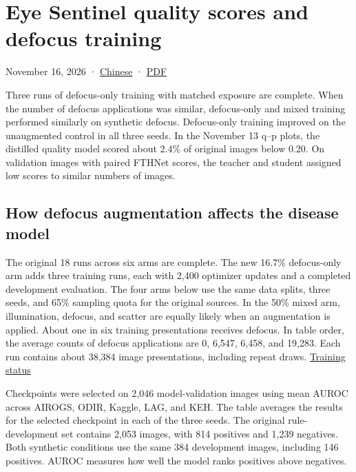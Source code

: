 \documentclass[
  10pt,
]{article}
\author{}
\date{}
\begin{document}
\section{Eye Sentinel quality scores and defocus
training}\label{eye-sentinel-quality-scores-and-defocus-training}

November 16, 2026 · \href{quality-alignment.zh.md}{Chinese} ·
\href{quality-alignment.en.pdf}{PDF}

Three runs of defocus-only training with matched exposure are complete.
When the number of defocus applications was similar, defocus-only and
mixed training performed similarly on synthetic defocus. Defocus-only
training improved on the unaugmented control in all three seeds. In the
November 13 q--p plots, the distilled quality model scored about 2.4\%
of original images below 0.20. On validation images with paired FTHNet
scores, the teacher and student assigned low scores to similar numbers
of images.

\subsection{How defocus augmentation affects the disease
model}\label{how-defocus-augmentation-affects-the-disease-model}

The original 18 runs across six arms are complete. The new 16.7\%
defocus-only arm adds three training runs, each with 2,400 optimizer
updates and a completed development evaluation. The four arms below use
the same data splits, three seeds, and 65\% sampling quota for the
original sources. In the 50\% mixed arm, illumination, defocus, and
scatter are equally likely when an augmentation is applied. About one in
six training presentations receives defocus. In table order, the average
counts of defocus applications are 0, 6,547, 6,458, and 19,283. Each run
contains about 38,384 image presentations, including repeat draws.
\href{../../../runs/followup_20261115/matched_defocus/status.json}{Training
status}

Checkpoints were selected on 2,046 model-validation images using mean
AUROC across AIROGS, ODIR, Kaggle, LAG, and KEH. The table averages the
results for the selected checkpoint in each of the three seeds. The
original rule-development set contains 2,053 images, with 814 positives
and 1,239 negatives. Both synthetic conditions use the same 384
development images, including 146 positives. AUROC measures how well the
model ranks positives above negatives.
\end{document}
